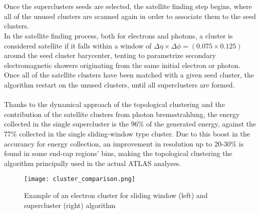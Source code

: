 \\\\
Once the superclusters seeds are selected, the satellite finding step begins, where all of the unused clusters are scanned again in order to associate them to the seed clusters.
\\
In the satellite finding process, both for electrons and photons, a cluster is considered satellite if it falls within a window of $\Delta \eta \times \Delta \phi = (0.075 \times 0.125)$ around the seed cluster barycenter, tenting to parametrize secondary electromagnetic showers  originating from the same initial electron or photon.
\\
Once all of the satellite clusters have been matched with a given seed cluster, the algorithm restart on the unused clusters, until all superclusters are formed.
\\\\
Thanks to the dynamical approach of the topological clustering and the contribution of the satellite clusters from photon bremsstrahlung, the energy collected in the single supercluster is the 96\% of the generated energy, against the 77\% collected in the single sliding-window type cluster. Due to this boost in the accurancy for energy collection, an improvement in resolution up to 20-30\% is found in some end-cap regions' bins, making the topological clustering the algorithm principally used in the actual ATLAS analyses.
\begin{figure}[h]
\centering
\texttt{[image: cluster\_comparison.png]}
\caption{Example of an electron cluster for sliding window (left) and supercluster (right) algorithm}
\end{figure}

